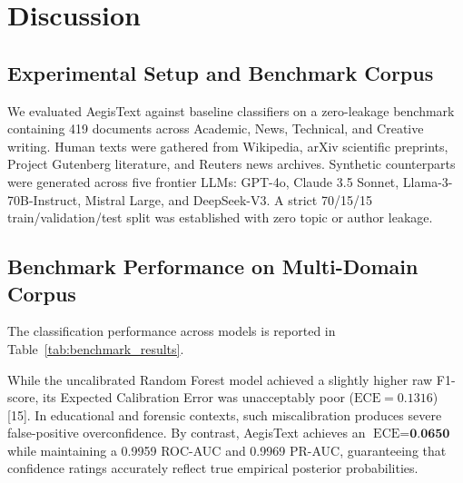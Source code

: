 \documentclass[conference]{IEEEtran}
\begin{document}
\section{Discussion}

\subsection{Experimental Setup and Benchmark Corpus}
We evaluated AegisText against baseline classifiers on a zero-leakage benchmark containing 419 documents across Academic, News, Technical, and Creative writing. Human texts were gathered from Wikipedia, arXiv scientific preprints, Project Gutenberg literature, and Reuters news archives. Synthetic counterparts were generated across five frontier LLMs: GPT-4o, Claude 3.5 Sonnet, Llama-3-70B-Instruct, Mistral Large, and DeepSeek-V3. A strict 70/15/15 train/validation/test split was established with zero topic or author leakage.

\subsection{Benchmark Performance on Multi-Domain Corpus}
The classification performance across models is reported in Table~\ref{tab:benchmark_results}.

\begin{table}[htbp]
\caption{Benchmark Performance on Multi-Domain Test Split}
\begin{center}
\label{tab:benchmark_results}
\end{center}
\end{table}

While the uncalibrated Random Forest model achieved a slightly higher raw F1-score, its Expected Calibration Error was unacceptably poor ($\text{ECE} = 0.1316$) [15]. In educational and forensic contexts, such miscalibration produces severe false-positive overconfidence. By contrast, AegisText achieves an $\text{ECE} = \textbf{0.0650}$ while maintaining a 0.9959 ROC-AUC and 0.9969 PR-AUC, guaranteeing that confidence ratings accurately reflect true empirical posterior probabilities.
\end{document}

